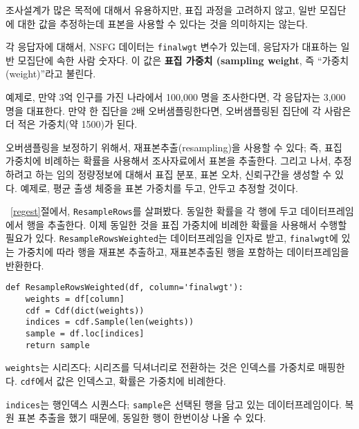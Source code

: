 조사설계가 많은 목적에 대해서 유용하지만, 표집 과정을 고려하지 않고, 일반 모집단에 대한 값을 추정하는데 표본을 사용할 수 있다는 것을 의미하지는 않는다.

각 응답자에 대해서, NSFG 데이터는 {\tt finalwgt} 변수가 있는데, 응답자가 대표하는 일반 모집단에 속한 사람 숫자다. 이 값은 {\bf 표집 가중치 (sampling weight}, 즉 ``가중치 (weight)''라고 불린다.

예제로, 만약 3억 인구를 가진 나라에서 100,000 명을 조사한다면, 각 응답자는 3,000 명을 대표한다. 만약 한 집단을 2배 오버샘플링한다면, 오버샘플링된 집단에 각 사람은 더 적은 가중치(약 1500)가 된다.

오버샘플링을 보정하기 위해서, 재표본추출(resampling)을 사용할 수 있다; 즉, 표집 가중치에 비례하는 확률을 사용해서 조사자료에서 표본을 추출한다.
그리고 나서, 추정하려고 하는 임의 정량정보에 대해서 표집 분포, 표본 오차, 신뢰구간을 생성할 수 있다. 예제로, 평균 출생 체중을 표본 가중치를 두고, 안두고 추정할 것이다.


~\ref{regest}절에서, {\tt ResampleRows}를 살펴봤다. 동일한 확률을 각 행에 두고 데이터프레임에서 행을 추출한다. 이제 동일한 것을 표집 가중치에 비례한 확률을 사용해서 수행할 필요가 있다. {\tt ResampleRowsWeighted}는 데이터프레임을 인자로 받고, {\tt finalwgt}에 있는 가중치에 따라 행을 재표본 추출하고, 재표본추출된 행을 포함하는 데이터프레임을 반환한다.


\begin{verbatim}
def ResampleRowsWeighted(df, column='finalwgt'):
    weights = df[column]
    cdf = Cdf(dict(weights))
    indices = cdf.Sample(len(weights))
    sample = df.loc[indices]
    return sample
\end{verbatim}

{\tt weights}는 시리즈다; 시리즈를 딕셔너리로 전환하는 것은 인덱스를 가중치로 매핑한다. {\tt cdf}에서 값은 인덱스고, 확률은 가중치에 비례한다.

{\tt indices}는 행인덱스 시퀀스다; {\tt sample}은 선택된 행을 담고 있는 데이터프레임이다. 복원 표본 추출을 했기 때문에, 동일한 행이 한번이상 나올 수 있다.

